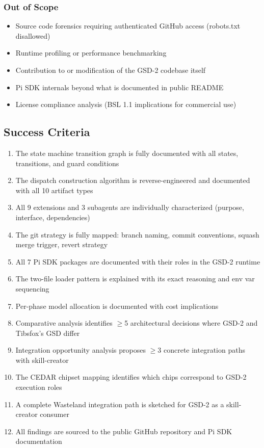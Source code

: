 \documentclass[11pt,letterpaper]{article}
\begin{document}
\subsubsection{Out of Scope}

\begin{itemize}
  \item Source code forensics requiring authenticated GitHub access (robots.txt disallowed)
  \item Runtime profiling or performance benchmarking
  \item Contribution to or modification of the GSD-2 codebase itself
  \item Pi SDK internals beyond what is documented in public README
  \item License compliance analysis (BSL 1.1 implications for commercial use)
\end{itemize}

\subsection{Success Criteria}

\begin{enumerate}
  \item The state machine transition graph is fully documented with all states, transitions, and guard conditions
  \item The dispatch construction algorithm is reverse-engineered and documented with all 10 artifact types
  \item All 9 extensions and 3 subagents are individually characterized (purpose, interface, dependencies)
  \item The git strategy is fully mapped: branch naming, commit conventions, squash merge trigger, revert strategy
  \item All 7 Pi SDK packages are documented with their roles in the GSD-2 runtime
  \item The two-file loader pattern is explained with its exact reasoning and env var sequencing
  \item Per-phase model allocation is documented with cost implications
  \item Comparative analysis identifies $\geq$5 architectural decisions where GSD-2 and Tibsfox's GSD differ
  \item Integration opportunity analysis proposes $\geq$3 concrete integration paths with skill-creator
  \item The CEDAR chipset mapping identifies which chips correspond to GSD-2 execution roles
  \item A complete Wasteland integration path is sketched for GSD-2 as a skill-creator consumer
  \item All findings are sourced to the public GitHub repository and Pi SDK documentation
\end{enumerate}
\end{document}
